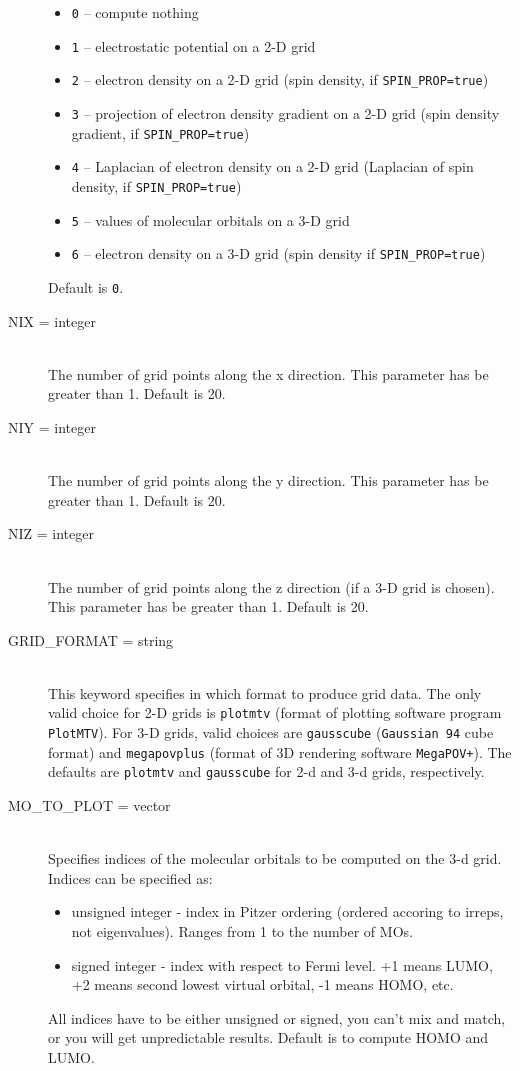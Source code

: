 \begin{description}
\begin{itemize}
\item {\tt 0} -- compute nothing
\item {\tt 1} -- electrostatic potential on a 2-D grid
\item {\tt 2} -- electron density on a 2-D grid (spin density, if {\tt SPIN\_PROP=true})
\item {\tt 3} -- projection of electron density gradient on a 2-D grid (spin density
gradient, if {\tt SPIN\_PROP=true})
\item {\tt 4} -- Laplacian of electron density on a 2-D grid (Laplacian of
spin density, if {\tt SPIN\_PROP=true})
\item {\tt 5} -- values of molecular orbitals on a 3-D grid
\item {\tt 6} -- electron density on a 3-D grid (spin density if {\tt SPIN\_PROP=true})
\end{itemize}
Default is {\tt 0}.

\item[NIX = integer]\mbox{}\\
The number of grid points along the x direction. This parameter has be greater than 1.
Default is 20.

\item[NIY = integer]\mbox{}\\
The number of grid points along the y direction. This parameter has be greater than 1.
Default is 20.

\item[NIZ = integer]\mbox{}\\
The number of grid points along the z direction (if a 3-D grid is chosen).
This parameter has be greater than 1. Default is 20.

\item[GRID\_FORMAT = string]\mbox{}\\
This keyword specifies in which format to produce grid data. The only valid choice
for 2-D grids is {\tt plotmtv} (format of plotting software program {\tt PlotMTV}).
For 3-D grids, valid choices are {\tt gausscube} ({\tt Gaussian 94} cube format)
and {\tt megapovplus} (format of 3D rendering software {\tt MegaPOV+}).
The defaults are {\tt plotmtv} and {\tt gausscube} for 2-d and 3-d grids,
respectively.

\item[MO\_TO\_PLOT = vector]\mbox{}\\
Specifies indices of the molecular orbitals to be computed on the 3-d grid. Indices can be specified
as:
\begin{itemize}
\item
unsigned integer - index in Pitzer ordering (ordered accoring to irreps, not eigenvalues).
Ranges from 1 to the number of MOs.
\item
signed integer - index with respect to Fermi level. +1 means LUMO, +2 means
second lowest virtual orbital, -1 means HOMO, etc.
\end{itemize}
All indices have to be either unsigned or signed, you can't mix and match,
or you will get unpredictable results.
Default is to compute HOMO and LUMO.


\end{description}
